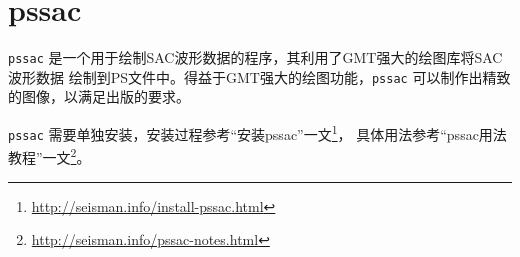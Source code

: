 \section{pssac}
\label{sec:pssac}

\texttt{pssac} 是一个用于绘制SAC波形数据的程序，其利用了GMT强大的绘图库将SAC波形数据
绘制到PS文件中。得益于GMT强大的绘图功能，\texttt{pssac} 可以制作出精致的图像，以满足出版的要求。

\texttt{pssac} 需要单独安装，安装过程参考``安装pssac''一文\footnote{\url{http://seisman.info/install-pssac.html}}，
具体用法参考``pssac用法教程''一文\footnote{\url{http://seisman.info/pssac-notes.html}}。
